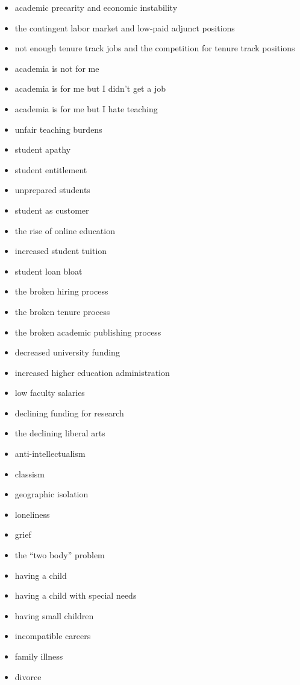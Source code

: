 \documentclass[]{book}
\providecommand{\tightlist}{%
  \setlength{\itemsep}{0pt}\setlength{\parskip}{0pt}}
\begin{document}
\begin{itemize}
\tightlist
\item
  academic precarity and economic instability
\item
  the contingent labor market and low-paid adjunct positions
\item
  not enough tenure track jobs and the competition for tenure track
  positions
\item
  academia is not for me
\item
  academia is for me but I didn't get a job
\item
  academia is for me but I hate teaching
\item
  unfair teaching burdens
\item
  student apathy
\item
  student entitlement
\item
  unprepared students
\item
  student as customer
\item
  the rise of online education
\item
  increased student tuition
\item
  student loan bloat
\item
  the broken hiring process
\item
  the broken tenure process
\item
  the broken academic publishing process
\item
  decreased university funding
\item
  increased higher education administration
\item
  low faculty salaries
\item
  declining funding for research
\item
  the declining liberal arts
\item
  anti-intellectualism
\item
  classism
\item
  geographic isolation
\item
  loneliness
\item
  grief
\item
  the ``two body'' problem
\item
  having a child
\item
  having a child with special needs
\item
  having small children
\item
  incompatible careers
\item
  family illness
\item
  divorce

\end{itemize}
\end{document}
